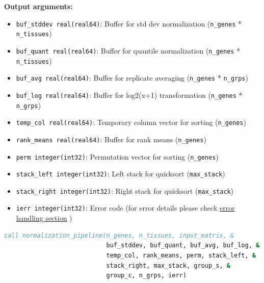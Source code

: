 \begin{enumerate}
          \textbf{Output arguments:}
          \begin{itemize}
            \item \texttt{buf\_stddev real(real64)}: Buffer for std dev normalization
                  (\texttt{n\_genes} * \texttt{n\_tissues})
                  
            \item \texttt{buf\_quant real(real64)}: Buffer for quantile normalization
                  (\texttt{n\_genes} * \texttt{n\_tissues})
                  
            \item \texttt{buf\_avg real(real64)}: Buffer for replicate averaging (\texttt{n\_genes}
                  * \texttt{n\_grps})
                  
            \item \texttt{buf\_log real(real64)}: Buffer for log2(x+1)
                  transformation (\texttt{n\_genes} * \texttt{n\_grps})
                  
            \item \texttt{temp\_col real(real64)}: Temporary column vector for sorting
                  (\texttt{n\_genes})
                  
            \item \texttt{rank\_means real(real64)}: Buffer for rank means (\texttt{n\_genes})
                  
            \item \texttt{perm integer(int32)}: Permutation vector for sorting (\texttt{n\_genes})
                  
            \item \texttt{stack\_left integer(int32)}: Left stack for quicksort (\texttt{max\_stack})
                  
            \item \texttt{stack\_right integer(int32)}: Right stack for quicksort (\texttt{max\_stack})
                  
            \item \texttt{ierr integer(int32)}: Error code (for error details please
                  check \hyperref[sec:error-handling]{error handling section} )
          \end{itemize}
          
          \begin{lstlisting}[language=Fortran, caption={Normalization Pipeline}]
call normalization_pipeline(n_genes, n_tissues, input_matrix, &
                            buf_stddev, buf_quant, buf_avg, buf_log, &
                            temp_col, rank_means, perm, stack_left, &
                            stack_right, max_stack, group_s, &
                            group_c, n_grps, ierr)
          \end{lstlisting}
          

\end{enumerate}
